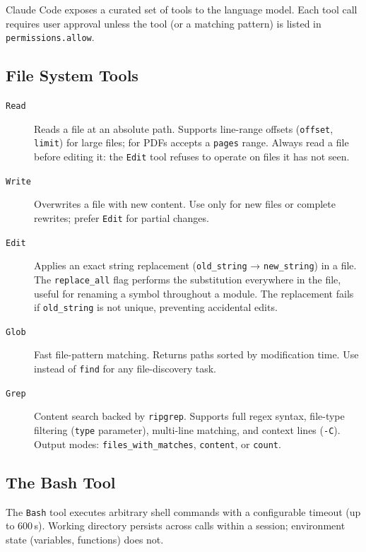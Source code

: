 Claude Code exposes a curated set of tools to the language model.  Each tool
call requires user approval unless the tool (or a matching pattern) is listed in
\texttt{permissions.allow}.

\subsection{File System Tools}
\label{app:claude-code:tools-fs}

\begin{description}
  \item[\texttt{Read}] Reads a file at an absolute path.  Supports line-range
        offsets (\texttt{offset}, \texttt{limit}) for large files; for PDFs
        accepts a \texttt{pages} range.  Always read a file before editing it:
        the \texttt{Edit} tool refuses to operate on files it has not seen.

  \item[\texttt{Write}] Overwrites a file with new content.  Use only for new
        files or complete rewrites; prefer \texttt{Edit} for partial changes.

  \item[\texttt{Edit}] Applies an exact string replacement (\texttt{old\_string}
        → \texttt{new\_string}) in a file.  The \texttt{replace\_all} flag
        performs the substitution everywhere in the file, useful for renaming a
        symbol throughout a module.  The replacement fails if \texttt{old\_string}
        is not unique, preventing accidental edits.

  \item[\texttt{Glob}] Fast file-pattern matching.  Returns paths sorted by
        modification time.  Use instead of \texttt{find} for any file-discovery
        task.

  \item[\texttt{Grep}] Content search backed by \texttt{ripgrep}.  Supports
        full regex syntax, file-type filtering (\texttt{type} parameter),
        multi-line matching, and context lines (\texttt{-C}).  Output modes:
        \texttt{files\_with\_matches}, \texttt{content}, or \texttt{count}.
\end{description}

\subsection{The Bash Tool}
\label{app:claude-code:tools-bash}

The \texttt{Bash} tool executes arbitrary shell commands with a configurable
timeout (up to 600\,s).  Working directory persists across calls within a
session; environment state (variables, functions) does not.


